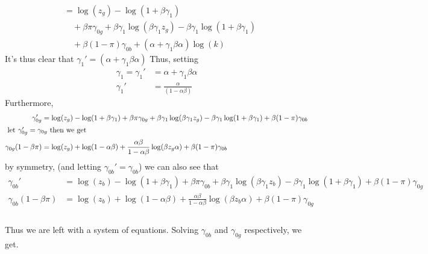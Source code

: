 \documentclass[12pt]{article}
\begin{document}
\begin{enumerate}
\begin{align*}
					     &=\log(z_g)  - \log(1 + \beta \gamma_1 ) \\
					     &\quad + \beta \pi  \gamma_{0g} + \beta \gamma_1 \log (\beta \gamma_1z_g) - \beta \gamma_1 \log(1 + \beta \gamma_1 ) \\
					     &\quad + \beta (1 - \pi) \gamma_{0b} + ( \alpha + \gamma_1  \beta \alpha ) \log(k) 
				\end{align*} 
				It's thus clear that 
				$\gamma_1' = ( \alpha + \gamma_1  \beta \alpha ) $
Thus, setting
\begin{align*}
	\gamma_1 = \gamma_1' &= \alpha + \gamma_1  \beta \alpha \\
	\gamma_1' &= \frac{\alpha}{(1 - \alpha \beta )}
\end{align*} Furthermore, 
				\begin{align*}
					\gamma_{0g}' &= \log(z_g)  - \log(1 + \beta \gamma_1 ) + \beta \pi  \gamma_{0g} + \beta \gamma_1 \log (\beta \gamma_1z_g) - \beta \gamma_1 \log(1 + \beta \gamma_1 ) + \beta (1 - \pi) \gamma_{0b} \\
					\intertext{ let $\gamma_{0g}' = \gamma_{0g}$ then we get }
					\gamma_{0g} (1 - \beta \pi ) &= \log(z_g)  + \log(1 - \alpha \beta  ) + \frac{\alpha \beta}{1 - \alpha \beta} \log (\beta z_g \alpha)  + \beta (1 - \pi) \gamma_{0b} \\
				\end{align*}
				by symmetry, (and letting $\gamma_{0b}' = \gamma_{0b}$) we can also see that 
				\begin{align*}
					\gamma_{0b}' &= \log(z_b)  - \log(1 + \beta \gamma_1 ) + \beta \pi  \gamma_{0b} + \beta \gamma_1 \log (\beta \gamma_1z_b) - \beta \gamma_1 \log(1 + \beta \gamma_1 ) + \beta (1 - \pi) \gamma_{0g} \\
					\gamma_{0b} (1 - \beta \pi ) &= \log(z_b)  + \log(1 - \alpha \beta  ) + \frac{\alpha \beta}{1 - \alpha \beta} \log (\beta z_b \alpha)  + \beta (1 - \pi) \gamma_{0g} \\
				\end{align*}
\\
Thus we are left with a system of equations.
Solving $\gamma_{0b}$ and $\gamma_{0g}$ respectively, we get.


\end{enumerate}
\end{document}
